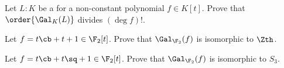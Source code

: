 \documentclass{article}
\begin{document}
\begin{exercise}
  Let $ L:K $ be a \sfe for a non-constant polynomial $ f\in K[t] $.
  Prove that $ \order{\Gal_K(L)} $ divides $ (\deg f)! $.
\end{exercise}
\begin{solution}

\end{solution}
\pagebreak

\begin{subexercise}
Let $ f = t\cb+t+1\in \F_2[t] $. Prove that $ \Gal_{\F_2}(f) $ is isomorphic to $ \Zth $.
\end{subexercise}
\begin{solution}

\end{solution}
\pagebreak

\begin{subexercise}
Let $ f = t\cb+t\sq+1\in \F_2[t] $. Prove that $ \Gal_{\F_2}(f) $ is isomorphic to $ S_3 $.
\end{subexercise}
\begin{solution}

\end{solution}
\end{document}
